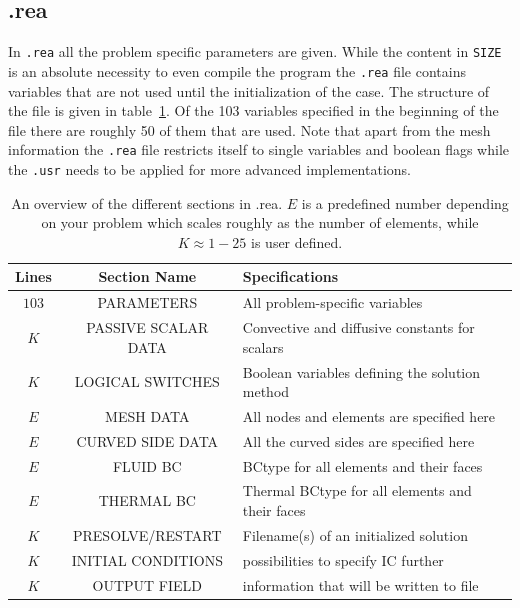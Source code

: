 \subsection{.rea}

In \verb|.rea| all the problem specific parameters are given. While the content in \verb|SIZE| 
is an absolute necessity to even compile the program the \verb|.rea| file contains variables 
that are not used until the initialization of the case. The structure of the file is given in table~\ref{tab:reafile}.
Of the 103 variables specified in the beginning of the file there are roughly 50 of them that are used. 
Note that apart from the mesh information the \verb|.rea| file restricts itself to single variables and boolean flags 
while the \verb|.usr| needs to be applied for more advanced implementations. 
%
\begin{table}[h]
    \centering
    \begin{tabular}{c c l}
       Lines & Section Name & Specifications \\ \hline
       $103$ & PARAMETERS & All problem-specific variables \\ 
       $K$ & PASSIVE SCALAR DATA & Convective and diffusive constants for scalars\\ 
       $K$ & LOGICAL SWITCHES & Boolean variables defining the solution method \\ 
       $E$ & MESH DATA & All nodes and elements are specified here\\
       $E$ & CURVED SIDE DATA & All the curved sides are specified here\\
       $E$ & FLUID BC& BCtype for all elements and their faces\\
       $E$ & THERMAL BC& Thermal BCtype for all elements and their faces\\
       $K$ & PRESOLVE/RESTART & Filename(s) of an initialized solution \\
       $K$ & INITIAL CONDITIONS & possibilities to specify IC further \\
       $K$ & OUTPUT FIELD & information that will be written to file \\
    \end{tabular}
    \caption{An overview of the different sections in .rea. $E$ is a predefined number depending on your problem
    which scales roughly as the number of elements, while $K\approx 1-25$ is user defined.}
    \label{tab:reafile}
\end{table}
%
